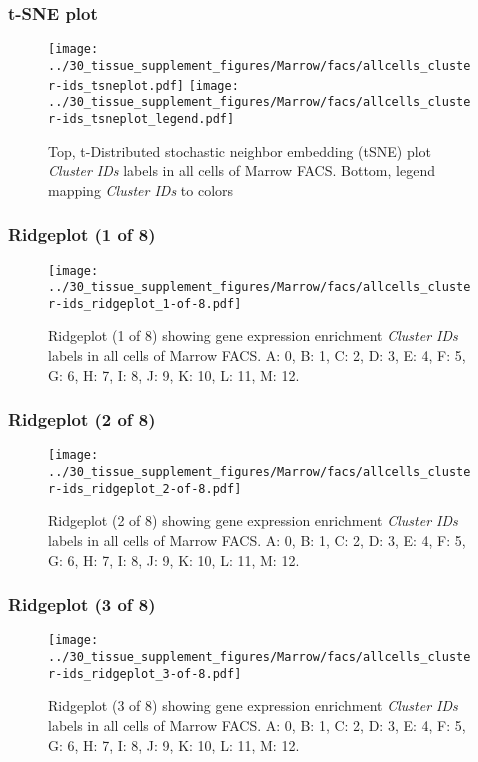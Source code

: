 \clearpage
\subsubsection{t-SNE plot}
\begin{figure}[h]
\centering
\texttt{[image: ../30\_tissue\_supplement\_figures/Marrow/facs/allcells\_cluster-ids\_tsneplot.pdf]}
\texttt{[image: ../30\_tissue\_supplement\_figures/Marrow/facs/allcells\_cluster-ids\_tsneplot\_legend.pdf]}
\caption{Top, t-Distributed stochastic neighbor embedding (tSNE) plot  \emph{Cluster IDs} labels in all cells of Marrow FACS. Bottom, legend mapping \emph{Cluster IDs} to colors}
\end{figure}


\clearpage

\subsubsection{Ridgeplot (1 of 8)}
\begin{figure}[h]
\centering
\texttt{[image: ../30\_tissue\_supplement\_figures/Marrow/facs/allcells\_cluster-ids\_ridgeplot\_1-of-8.pdf]}

\caption{ Ridgeplot (1 of 8)  showing gene expression enrichment \emph{Cluster IDs} labels in all cells of Marrow FACS. A: 0, B: 1, C: 2, D: 3, E: 4, F: 5, G: 6, H: 7, I: 8, J: 9, K: 10, L: 11, M: 12.}
\end{figure}


\clearpage

\subsubsection{Ridgeplot (2 of 8)}
\begin{figure}[h]
\centering
\texttt{[image: ../30\_tissue\_supplement\_figures/Marrow/facs/allcells\_cluster-ids\_ridgeplot\_2-of-8.pdf]}

\caption{ Ridgeplot (2 of 8)  showing gene expression enrichment \emph{Cluster IDs} labels in all cells of Marrow FACS. A: 0, B: 1, C: 2, D: 3, E: 4, F: 5, G: 6, H: 7, I: 8, J: 9, K: 10, L: 11, M: 12.}
\end{figure}


\clearpage

\subsubsection{Ridgeplot (3 of 8)}
\begin{figure}[h]
\centering
\texttt{[image: ../30\_tissue\_supplement\_figures/Marrow/facs/allcells\_cluster-ids\_ridgeplot\_3-of-8.pdf]}

\caption{ Ridgeplot (3 of 8)  showing gene expression enrichment \emph{Cluster IDs} labels in all cells of Marrow FACS. A: 0, B: 1, C: 2, D: 3, E: 4, F: 5, G: 6, H: 7, I: 8, J: 9, K: 10, L: 11, M: 12.}
\end{figure}


